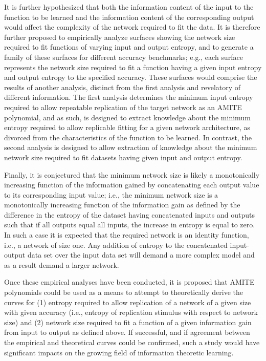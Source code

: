 It is further hypothesized that both the information content of the input to the function to be learned and the information content of the corresponding output would affect the complexity of the network required to fit the data.  It is therefore further proposed to empirically analyze surfaces showing the network size required to fit functions of varying input and output entropy, and to generate a family of these surfaces for different accuracy benchmarks; e.g., each surface represents the network size required to fit a function having a given input entropy and output entropy to the specified accuracy.  These surfaces would comprise the results of another analysis, distinct from the first analysis and revelatory of different information.  The first analysis determines the minimum input entropy required to allow repeatable replication of the target network as an AMITE polynomial, and as such, is designed to extract knowledge about the minimum entropy required to allow replicable fitting for a given network architecture, as divorced from the characteristics of the function to be learned.  In contrast, the second analysis is designed to allow extraction of knowledge about the minimum network size required to fit datasets having given input and output entropy.

Finally, it is conjectured that the minimum network size is likely a monotonically increasing function of the information gained by concatenating each output value to its corresponding input value; i.e., the minimum network size is a monotonically increasing function of the information gain as defined by the difference in the entropy of the dataset having concatenated inputs and outputs such that if all outputs equal all inputs, the increase in entropy is equal to zero.  In such a case it is expected that the required network is an identity function, i.e., a network of size one.  Any addition of entropy to the concatenated input-output data set over the input data set will demand a more complex model and as a result demand a larger network.

Once these empirical analyses have been conducted, it is proposed that AMITE polynomials could be used as a means to attempt to theoretically derive the curves for (1) entropy required to allow replication of a network of a given size with given accuracy (i.e., entropy of replication stimulus with respect to network size) and (2) network size required to fit a function of a given information gain from input to output as defined above.  If successful, and if agreement between the empirical and theoretical curves could be confirmed, such a study would have significant impacts on the growing field of information theoretic learning.

